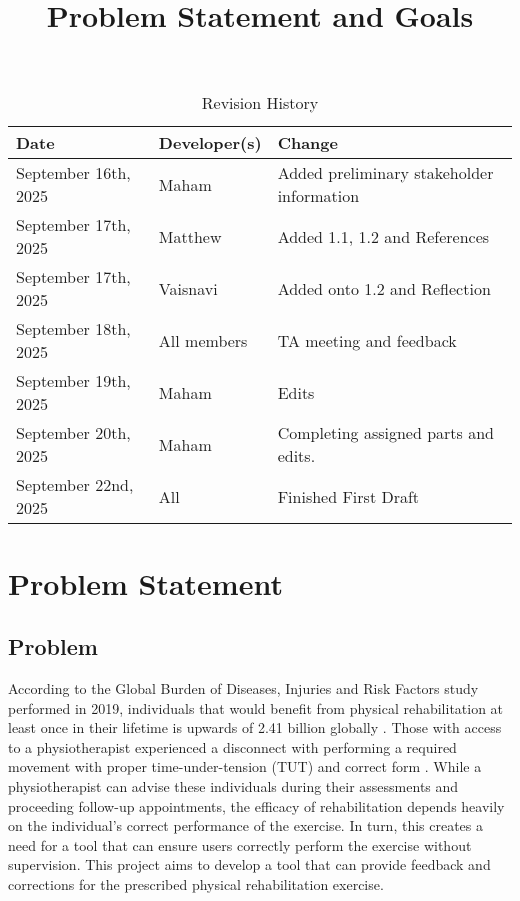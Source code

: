 \documentclass{article}
\title{Problem Statement and Goals\\\progname}
\author{\authname}
\date{}
\begin{document}
\maketitle

\begin{table}[hp]
\caption{Revision History} \label{TblRevisionHistory}
\begin{tabularx}{\textwidth}{llX}
\toprule
\textbf{Date} & \textbf{Developer(s)} & \textbf{Change}\\
\midrule
September 16th, 2025 & Maham & Added preliminary stakeholder information\\
September 17th, 2025 & Matthew & Added 1.1, 1.2 and References\\
September 17th, 2025 & Vaisnavi & Added onto 1.2 and Reflection\\
September 18th, 2025 & All members & TA meeting and feedback\\
September 19th, 2025 & Maham & Edits \\
September 20th, 2025 & Maham & Completing assigned parts and edits. \\
September 22nd, 2025 & All & Finished First Draft \\

\bottomrule
\end{tabularx}
\end{table}

\section{Problem Statement}

\subsection{Problem}

According to the Global Burden of Diseases, Injuries and Risk Factors study performed in 2019, 
individuals that would benefit from physical rehabilitation at least once in their 
lifetime is upwards of 2.41 billion globally \citep{CiezaEtAl2021}.
Those with access to a physiotherapist experienced a 
disconnect with performing a required movement with proper time-under-tension (TUT) and 
correct form \citep{FaberEtAl2015}. While a physiotherapist can advise these individuals
during their assessments and proceeding follow-up appointments, the efficacy of rehabilitation
depends heavily on the individual's correct performance of the exercise. In turn, this creates a need for a tool that can ensure users 
correctly perform the exercise without supervision. This project aims to develop a tool that can 
provide feedback and corrections for the prescribed physical rehabilitation exercise.
\end{document}

